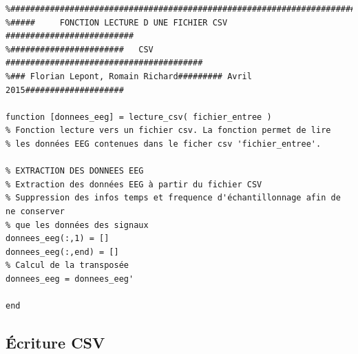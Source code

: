 \begin{verbatim}
%##########################################################################
%#####     FONCTION LECTURE D UNE FICHIER CSV    ##########################
%#######################   CSV     ########################################
%### Florian Lepont, Romain Richard######### Avril 2015####################

function [donnees_eeg] = lecture_csv( fichier_entree )
% Fonction lecture vers un fichier csv. La fonction permet de lire
% les données EEG contenues dans le ficher csv 'fichier_entree'. 

% EXTRACTION DES DONNEES EEG 
% Extraction des données EEG à partir du fichier CSV
% Suppression des infos temps et frequence d'échantillonnage afin de ne conserver 
% que les données des signaux
donnees_eeg(:,1) = [] 			
donnees_eeg(:,end) = []     
% Calcul de la transposée                                                
donnees_eeg = donnees_eeg'			

end
\end{verbatim}




\newpage
\subsection*{Écriture CSV}

